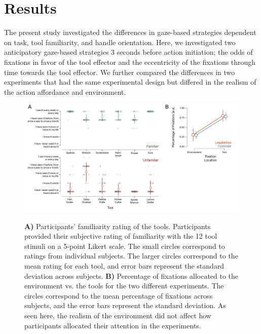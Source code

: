 \section{Results}

The present study investigated the differences in gaze-based strategies dependent on task, tool familiarity, and handle orientation. Here, we investigated two anticipatory gaze-based strategies 3 seconds before action initiation; the odds of fixations in favor of the tool effector and the eccentricity of the fixations through time towards the tool effector. We further compared the differences in two experiments that had the same experimental design but differed in the realism of the action affordance and environment. 


\begin{figure}[t]
    \centering
    \includegraphics[width=1\linewidth]{source/figures/result/results_exp_comp.png} \\
    \caption[]{ \textbf{A)}  Participants’ familiarity rating of the tools. Participants provided their subjective rating of familiarity with the 12 tool stimuli on a 5-point Likert scale. The small circles correspond to ratings from individual subjects. The larger circles correspond to the mean rating for each tool, and error bars represent the standard deviation across subjects. \textbf{B)} Percentage of fixations allocated to the environment vs. the tools for the two different experiments. The circles correspond to the mean percentage of fixations across subjects, and the error bars represent the standard deviation. As seen here, the realism of the environment did not affect how participants allocated their attention in the experiments. }
    \label{figure:familiarity_rating}
\end{figure}

